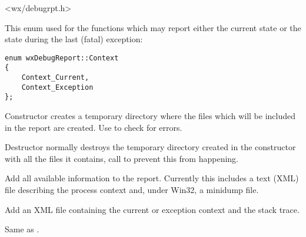 <wx/debugrpt.h>


This enum used for the functions which may report either the current state
or the state during the last (fatal) exception:
\begin{verbatim}
enum wxDebugReport::Context
{
    Context_Current,
    Context_Exception
};
\end{verbatim}



\label{wxdebugreportwxdebugreport}


Constructor creates a temporary directory where the files which will
be included in the report are created. Use 
 to check for errors.


\label{wxdebugreportdtor}


Destructor normally destroys the temporary directory created in the constructor
with all the files it contains, call  to
prevent this from happening.


\label{wxdebugreportaddall}


Add all available information to the report. Currently this includes a
text (XML) file describing the process context and, under Win32, a minidump
file.


\label{wxdebugreportaddcontext}


Add an XML file containing the current or exception context and the
stack trace.


\label{wxdebugreportaddcurrentcontext}


Same as .


\label{wxdebugreportaddcurrentdump}


